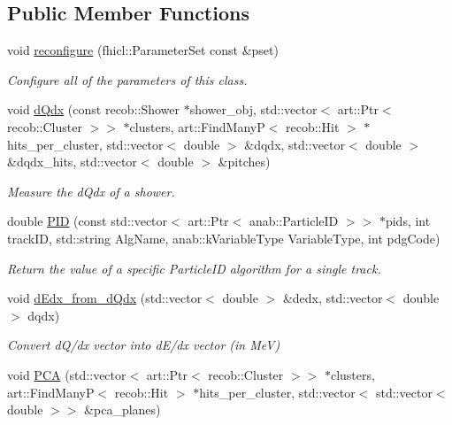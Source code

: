 \subsection*{Public Member Functions}
\begin{DoxyCompactItemize}
\item 
void \hyperlink{group__lee_ga4523185d78d6b7aa94dbf26475750282}{reconfigure} (fhicl\-::\-Parameter\-Set const \&pset)
\begin{DoxyCompactList}\small\item\em Configure all of the parameters of this class. \end{DoxyCompactList}\item 
void \hyperlink{group__lee_ga3ab3ce039f7c08ce5fbb1126a861c36c}{d\-Qdx} (const recob\-::\-Shower $\ast$shower\-\_\-obj, std\-::vector$<$ art\-::\-Ptr$<$ recob\-::\-Cluster $>$$>$ $\ast$clusters, art\-::\-Find\-Many\-P$<$ recob\-::\-Hit $>$ $\ast$hits\-\_\-per\-\_\-cluster, std\-::vector$<$ double $>$ \&dqdx, std\-::vector$<$ double $>$ \&dqdx\-\_\-hits, std\-::vector$<$ double $>$ \&pitches)
\begin{DoxyCompactList}\small\item\em Measure the d\-Qdx of a shower. \end{DoxyCompactList}\item 
double \hyperlink{group__lee_ga493326200e39f3aaa22999c55c22b6f5}{P\-I\-D} (const std\-::vector$<$ art\-::\-Ptr$<$ anab\-::\-Particle\-I\-D $>$$>$ $\ast$pids, int track\-I\-D, std\-::string Alg\-Name, anab\-::k\-Variable\-Type Variable\-Type, int pdg\-Code)
\begin{DoxyCompactList}\small\item\em Return the value of a specific Particle\-I\-D algorithm for a single track. \end{DoxyCompactList}\item 
void \hyperlink{group__lee_ga2844c7f27f79fbe5e16d9c674ca4afa1}{d\-Edx\-\_\-from\-\_\-d\-Qdx} (std\-::vector$<$ double $>$ \&dedx, std\-::vector$<$ double $>$ dqdx)
\begin{DoxyCompactList}\small\item\em Convert d\-Q/dx vector into d\-E/dx vector (in Me\-V) \end{DoxyCompactList}\item 
void \hyperlink{group__lee_gac5f41d2b1bee9a0f761179f3059f8a49}{P\-C\-A} (std\-::vector$<$ art\-::\-Ptr$<$ recob\-::\-Cluster $>$$>$ $\ast$clusters, art\-::\-Find\-Many\-P$<$ recob\-::\-Hit $>$ $\ast$hits\-\_\-per\-\_\-cluster, std\-::vector$<$ std\-::vector$<$ double $>$$>$ \&pca\-\_\-planes)

\end{DoxyCompactItemize}
